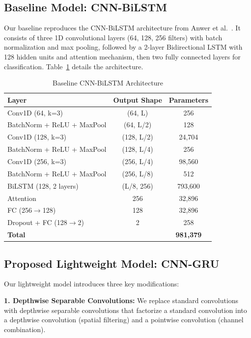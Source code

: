 \documentclass[10pt,journal]{IEEEtran}
\begin{document}
\subsection{Baseline Model: CNN-BiLSTM}
\label{sec:baseline}

Our baseline reproduces the CNN-BiLSTM architecture from Anwer et al.~\cite{anwer2025advanced}. It consists of three 1D convolutional layers (64, 128, 256 filters) with batch normalization and max pooling, followed by a 2-layer Bidirectional LSTM with 128 hidden units and attention mechanism, then two fully connected layers for classification. Table~\ref{tab:baseline} details the architecture.

\begin{table}[t]
\centering
\caption{Baseline CNN-BiLSTM Architecture}
\label{tab:baseline}
\begin{tabular}{lcc}
\toprule
Layer & Output Shape & Parameters \\
\midrule
Conv1D (64, k=3) & (64, L) & 256 \\
BatchNorm + ReLU + MaxPool & (64, L/2) & 128 \\
Conv1D (128, k=3) & (128, L/2) & 24,704 \\
BatchNorm + ReLU + MaxPool & (128, L/4) & 256 \\
Conv1D (256, k=3) & (256, L/4) & 98,560 \\
BatchNorm + ReLU + MaxPool & (256, L/8) & 512 \\
BiLSTM (128, 2 layers) & (L/8, 256) & 793,600 \\
Attention & 256 & 32,896 \\
FC (256$\rightarrow$128) & 128 & 32,896 \\
Dropout + FC (128$\rightarrow$2) & 2 & 258 \\
\midrule
\textbf{Total} & & \textbf{981,379} \\
\bottomrule
\end{tabular}
\end{table}

\subsection{Proposed Lightweight Model: CNN-GRU}
\label{sec:lightweight}

Our lightweight model introduces three key modifications:

\noindent\textbf{1. Depthwise Separable Convolutions:} We replace standard convolutions with depthwise separable convolutions that factorize a standard convolution into a depthwise convolution (spatial filtering) and a pointwise convolution (channel combination).
\end{document}
